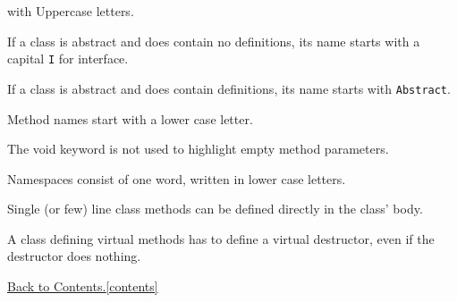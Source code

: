 \documentclass[11pt, oneside]{scrartcl}
\newcommand{\backtocontents}{\hyperref[contents]{Back to Contents.\ref*{contents}}}
\begin{document}
\begin{itemize*}
with Uppercase letters.
\item If a class is abstract and does contain no definitions, its name starts
with a capital \texttt{I} for interface.
\item If a class is abstract and does contain definitions, its name starts with
\texttt{Abstract}.
\item Method names start with a lower case letter.
\item The void keyword is not used to highlight empty method parameters.
\item Namespaces consist of one word, written in lower case letters.
\item Single (or few) line class methods can be defined directly in the
class' body.
\item A class defining virtual methods has to define a virtual destructor, even
if the destructor does nothing.
\end{itemize*}

\backtocontents
\end{document}
